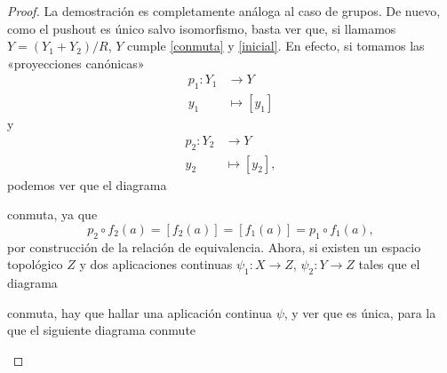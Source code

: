 \documentclass[12pt,a4paper]{book}
\theoremstyle{definition} \newtheorem{defn}[thm]{Definición}
\theoremstyle{definition} \newtheorem{ejemplo}[thm]{Ejemplo}
\theoremstyle{definition} \newtheorem{ejercicio}[thm]{Ejercicio}
\theoremstyle{remark} \newtheorem*{obs}{Observación}
\begin{document}
\begin{proof}
  La demostración es completamente análoga al caso de grupos. De nuevo, como el pushout es único salvo isomorfismo, basta ver que, si llamamos $Y=(Y_1+Y_2)/R$, $Y$ cumple \ref{conmuta} y \ref{inicial}. En efecto, si tomamos las «proyecciones canónicas»
\begin{align*}
  p_1 :Y_1&\longrightarrow Y\\ 
  y_1 &\longmapsto [y_1] 
  \end{align*}
  y
\begin{align*}
  p_2 :Y_2&\longrightarrow Y\\ 
  y_2 &\longmapsto [y_2], 
  \end{align*}
  podemos ver que el diagrama
    \begin{center}
  \end{center}
  conmuta, ya que 
  \begin{equation*}
    p_2\circ f_2(a) = [f_2(a)]=[f_1(a)] = p_1\circ f_1 (a),
  \end{equation*}
  por construcción de la relación de equivalencia. Ahora, si existen un espacio topológico $Z$ y dos aplicaciones continuas $\psi_1:X\rightarrow Z$, $\psi_2:Y\rightarrow Z$ tales que el diagrama 
    \begin{center}
  \end{center}
  conmuta, hay que hallar una aplicación continua $\psi$, y ver que es única, para la que el siguiente diagrama conmute
    \begin{center}
\end{center}
\end{proof}
\end{document}
